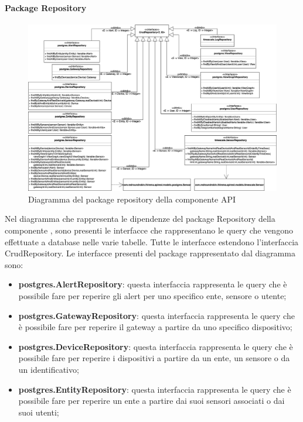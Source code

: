 		\begin{landscape}
		\paragraph*{Package Repository}
		\begin{figure}[H]
			\centering
			\includegraphics[scale=0.500]{res/images/API/RepositoryPackage.png}
			\caption{Diagramma del package repository della componente API}
			\label{Diagramma 15}
		\end{figure}
		Nel diagramma che rappresenta le dipendenze del package Repository della componente , sono presenti le interfacce che rappresentano le query che vengono effettuate a database nelle varie tabelle. Tutte le interfacce estendono l'interfaccia CrudRepository.
		Le interfacce presenti del package rappresentato dal diagramma sono:
		\begin{itemize}
			\item \textbf{postgres.AlertRepository}: questa interfaccia rappresenta le query che è possibile fare per reperire gli alert per uno specifico ente, sensore o utente;
			\item \textbf{postgres.GatewayRepository}: questa interfaccia rappresenta le query che è possibile fare per reperire il gateway a partire da uno specifico dispositivo;
			\item \textbf{postgres.DeviceRepository}: questa interfaccia rappresenta le query che è possibile fare per reperire i dispositivi a partire da un ente, un sensore o da un identificativo;
			\item \textbf{postgres.EntityRepository}: questa interfaccia rappresenta le query che è possibile fare per reperire un ente a partire dai suoi sensori associati o dai suoi utenti;

\end{itemize}
\end{landscape}
